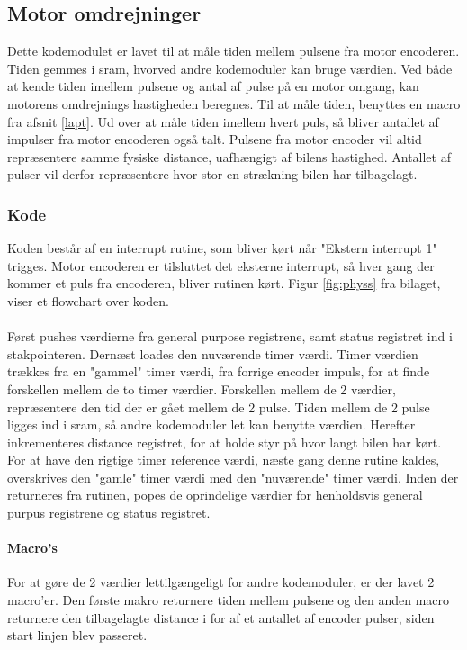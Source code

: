 \newpage

\subsection{Motor omdrejninger}
Dette kodemodulet er lavet til at måle tiden mellem pulsene fra motor encoderen. Tiden gemmes i sram, hvorved andre kodemoduler kan bruge værdien. Ved både at kende tiden imellem pulsene og antal af pulse på en motor omgang, kan motorens omdrejnings hastigheden beregnes. Til at måle tiden, benyttes en macro fra afsnit \ref{lapt}. Ud over at måle tiden imellem hvert puls, så bliver antallet af impulser fra motor encoderen også talt. Pulsene fra motor encoder vil altid repræsentere samme fysiske distance, uafhængigt af bilens hastighed. Antallet af pulser vil derfor repræsentere hvor stor en strækning bilen har tilbagelagt.  

\subsubsection{Kode}
Koden består af en interrupt rutine, som bliver kørt når "Ekstern interrupt 1" trigges. Motor encoderen er tilsluttet det eksterne interrupt, så hver gang der kommer et puls fra encoderen, bliver rutinen kørt. Figur \ref{fig:physs} fra bilaget, viser et flowchart over koden.\\
\\
Først pushes værdierne fra general purpose registrene, samt status registret ind i stakpointeren. Dernæst loades den nuværende timer værdi. Timer værdien trækkes fra en "gammel" timer værdi, fra forrige encoder impuls, for at finde forskellen mellem de to timer værdier. Forskellen mellem de 2 værdier, repræsentere den tid der er gået mellem de 2 pulse. Tiden mellem de 2 pulse ligges ind i sram, så andre kodemoduler let kan benytte værdien. Herefter inkrementeres distance registret, for at holde styr på hvor langt bilen har kørt. For at have den rigtige timer reference værdi, næste gang denne rutine kaldes, overskrives den "gamle" timer værdi med den "nuværende" timer værdi. Inden der returneres fra rutinen, popes de oprindelige værdier for henholdsvis general purpus registrene og status registret.

\paragraph{Macro's}
For at gøre de 2 værdier lettilgængeligt for andre kodemoduler, er der lavet 2 macro'er. Den første makro returnere tiden mellem pulsene og den anden macro returnere den tilbagelagte distance i for af et antallet af encoder pulser, siden start linjen blev passeret.